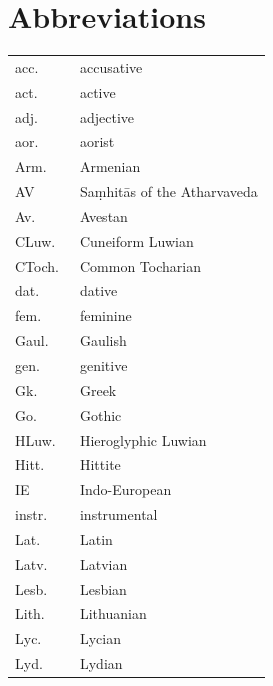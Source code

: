 \documentclass[output=paper,colorlinks,citecolor=brown]{langscibook}
\begin{document}
\section*{Abbreviations}
\begin{tabularx}{.48\textwidth}{lQ}
acc.\ & accusative\\
act.\ & active\\
adj.\ & adjective\\
aor.\ & aorist\\
Arm.\ & Armenian\\
AV & Saṃhitās of the Atharvaveda\\
Av.\ & Avestan\\
CLuw.\ & Cuneiform Luwian\\
CToch.\ & Common Tocharian\\
dat.\ & dative\\
fem.\ & feminine\\
Gaul.\ & Gaulish\\
gen.\ & genitive\\
Gk.\ & Greek\\
Go.\ & Gothic\\
HLuw.\ & Hieroglyphic Luwian\\
Hitt.\ & Hittite\\
IE & Indo-European\\
instr.\ & instrumental\\
Lat.\ & Latin\\
Latv.\ & Latvian\\
Lesb.\ & Lesbian\\
Lith.\ & Lithuanian\\
Lyc.\ & Lycian\\
Lyd.\ & Lydian\\
\end{tabularx}
\end{document}
